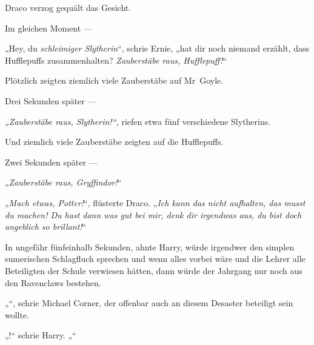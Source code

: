 Draco verzog gequält das Gesicht.

Im gleichen Moment —

„Hey, du \emph{schleimiger Slytherin}“, schrie Ernie, „hat dir noch niemand erzählt, dass Hufflepuffs zusammenhalten? \emph{Zauberstäbe raus, Hufflepuff!}“

Plötzlich zeigten ziemlich viele Zauberstäbe auf Mr~Goyle.

Drei Sekunden später —

\emph{„Zauberstäbe raus, Slytherin!“,} riefen etwa fünf verschiedene Slytherins.

Und ziemlich viele Zauberstäbe zeigten auf die Hufflepuffs.

Zwei Sekunden später —

„\emph{Zauberstäbe raus, Gryffindor!}“

„\emph{Mach etwas, Potter!}“, flüsterte Draco.
„\emph{Ich kann das nicht aufhalten, das musst du machen! Du hast dann was gut bei mir, denk dir irgendwas aus, du bist doch angeblich so brillant!}“

In ungefähr fünfeinhalb Sekunden, ahnte Harry, würde irgendwer den simplen sumerischen Schlagfluch sprechen und wenn alles vorbei wäre und die Lehrer alle Beteiligten der Schule verwiesen hätten, dann würde der Jahrgang nur noch aus den Ravenclaws bestehen.

„“, schrie Michael Corner, der offenbar auch an diesem Desaster beteiligt sein wollte.

„!“ schrie Harry.
„“

